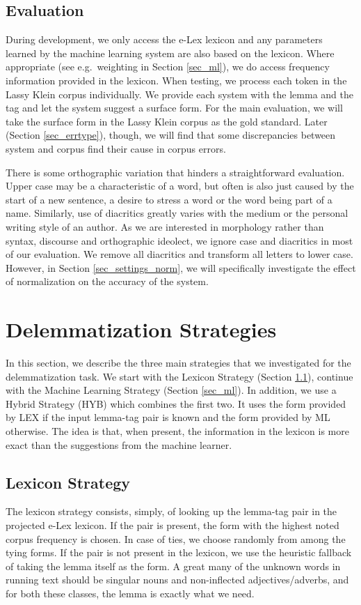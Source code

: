 \documentclass[a4paper,10pt,twoside]{article}
\begin{document}
\subsection{Evaluation}
\label{sec_eval}
During development, we only access the e-Lex lexicon and any parameters learned by the machine learning system are also based on the lexicon. Where appropriate (see e.g.\ weighting in Section \ref{sec_ml}), we do access frequency information provided in the lexicon. When testing, we process each token in the Lassy Klein corpus individually. We provide each system with the lemma and the tag and let the system suggest a surface form. For the main evaluation, we will take the surface form in the Lassy Klein corpus as the gold standard. Later (Section \ref{sec_errtype}), though, we will find that some discrepancies between system and corpus find their cause in corpus errors. 

There is some orthographic variation that hinders a straightforward evaluation. Upper case may be a characteristic of a word, but often is also just caused by the start of a new sentence, a desire to stress a word or the word being part of a name. Similarly, use of diacritics greatly varies with the medium or the personal writing style of an author. As we are interested in morphology rather than syntax, discourse and orthographic ideolect, we ignore case and diacritics in most of our evaluation. We remove all diacritics and transform all letters to lower case. However, in Section \ref{sec_settings_norm}, we will specifically investigate the effect of normalization on the accuracy of the system.


\section{Delemmatization Strategies}
\label{sec_strat}

In this section, we describe the three main strategies that we investigated for the delemmatization task. We start with the Lexicon Strategy (Section \ref{sec_lex}), continue with the Machine Learning Strategy (Section \ref{sec_ml}). In addition, we use a Hybrid Strategy (HYB) which combines the first two. It uses the form provided by LEX if the input lemma-tag pair is known and the form provided by ML otherwise. The idea is that, when present, the information in the lexicon is more exact than the suggestions from the machine learner. 

\subsection{Lexicon Strategy}
\label{sec_lex}
The lexicon strategy consists, simply, of looking up the lemma-tag pair in the projected e-Lex lexicon. If the pair is present, the form with the highest noted corpus frequency is chosen. In case of ties, we choose randomly from among the tying forms. If the pair is not present in the lexicon, we use the heuristic fallback of taking the lemma itself as the form. A great many of the unknown words in running text should be singular nouns and non-inflected adjectives/adverbs, and for both these classes, the lemma is exactly what we need.
\end{document}
